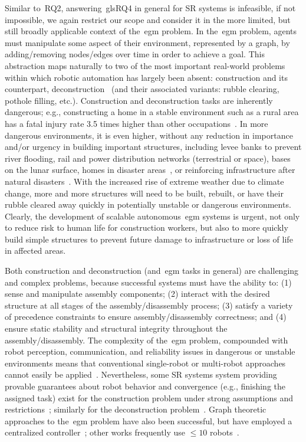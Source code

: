 \noindent
Similar to~\gls{RQ2}, answering~gls{RQ4} in general for SR systems is
infeasible, if not impossible, we again restrict our scope and consider it in
the more limited, but still broadly applicable context of the~\gls{egm}
problem. In the~\gls{egm} problem, agents must manipulate some aspect of their
environment, represented by a graph, by adding/removing nodes/edges over time in
order to achieve a goal. This abstraction maps naturally to two of the most
important real-world problems within which robotic automation has largely been
absent: construction and its counterpart, deconstruction~\cite{Werfel2006} (and
their associated variants: rubble clearing, pothole filling, etc.). Construction
and deconstruction tasks are inherently dangerous; e.g., constructing a home in
a stable environment such as a rural area has a fatal injury rate 3.5 times
higher than other occupations~\cite{Napp2012}. In more dangerous environments,
it is even higher, without any reduction in importance and/or urgency in
building important structures, including levee banks to prevent river flooding,
rail and power distribution networks (terrestrial or space), bases on the lunar
surface, homes in disaster areas~\cite{Zhang2011,Allwright2014,Grushin2006}, or
reinforcing infrastructure after natural disasters~\cite{Magnenat2012}.  With
the increased rise of extreme weather due to climate change, more and more
structures will need to be built, rebuilt, or have their rubble cleared away
quickly in potentially unstable or dangerous environments. Clearly, the
development of scalable autonomous~\gls{egm} systems is urgent, not only to
reduce risk to human life for construction workers, but also to more quickly
build simple structures to prevent future damage to infrastructure or loss of
life in affected areas.

Both construction and deconstruction (and~\gls{egm} tasks in general) are
challenging and complex problems, because successful systems must have the
ability to: (1) sense and manipulate assembly components; (2) interact with the
desired structure at all stages of the assembly/disassembly process; (3) satisfy
a variety of precedence constraints to ensure assembly/disassembly correctness;
and (4) ensure static stability and structural integrity throughout the
assembly/disassembly. The complexity of the~\gls{egm} problem, compounded with
robot perception, communication, and reliability issues in dangerous or unstable
environments means that conventional single-robot or multi-robot approaches
cannot easily be applied~\cite{Magnenat2012}. Nevertheless, some SR systems
system providing provable guarantees about robot behavior and convergence (e.g.,
finishing the assigned task) exist for the construction problem under strong
assumptions and restrictions~\cite{Petersen2011,Meng2008}; similarly for the
deconstruction problem~\cite{Petersen2011}.  Graph theoretic approaches to
the~\gls{egm} problem have also been successful, but have employed a centralized
controller~\cite{Worcester2011}; other works frequently use $\le 10$
robots~\cite{Worcester2011,Zhang2011,Allright2017,Zhang2008}.

